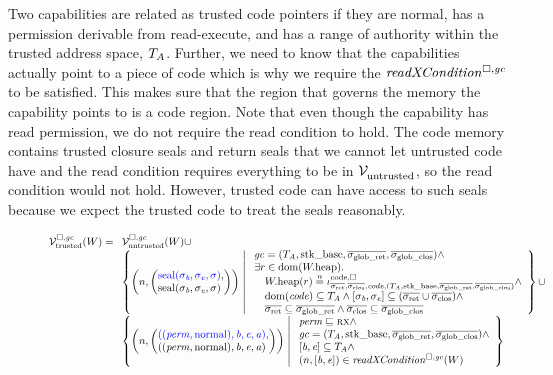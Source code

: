 \begin{jversion}
Two capabilities are related as trusted code pointers if they are normal, has a permission derivable from read-execute, and has a range of authority within the trusted address space, $\ta$.
Further, we need to know that the capabilities actually point to a piece of code which is why we require the $\xReadCond{}$ to be satisfied.
This makes sure that the region that governs the memory the capability points to is a code region.
Note that even though the capability has read permission, we do not require the read condition to hold.
The code memory contains trusted closure seals and return seals that we cannot let untrusted code have and the read condition requires everything to be in $\lrv[]$, so the read condition would not hold.
However, trusted code can have access to such seals because we expect the trusted code to treat the seals reasonably.
\begin{figure}
  \centering
  \[
  \lrvtrusted[\square,\gc](W) =
  \begin{array}[t]{l}
    \lrv(W)\cup \\
%
    \left\{ \npair{\left(\arraycolsep=0pt\array{l} \src{\seal{\sigma_\baddr,\sigma_\eaddr,\sigma}},\\ \seal{\sigma_\baddr,\sigma_\eaddr,\sigma} \endarray \right)} 
    \; \middle| \;
    \begin{array}{l}
      \gc = (\ta,\stkb,\gsigrets,\gsigcloss)  \wedge \\
      \exists r \in \dom(\pwheap) \ldotp \\
      \quad \pwheap(r) \nequal \codereg{\sigrets,\sigcloss,\code,(\ta,\stkb,\gsigrets,\gsigcloss)} \wedge\\
      \quad \dom(\code) \subseteq \ta \wedge [\sigma_\baddr,\sigma_\eaddr] \subseteq (\sigrets\cup\sigcloss) \wedge\\
      \quad \sigrets \subseteq \gsigrets \wedge \sigcloss \subseteq \gsigcloss
    \end{array}
    \right\} \cup \\
    \left\{ \npair{\left(\arraycolsep=0pt\array{l} \src{((\perm,\normal),\baddr,\eaddr,\aaddr)},\\ ((\perm,\normal),\baddr,\eaddr,\aaddr) \endarray \right)} \;\middle|\; 
    \begin{array}{l}
      \perm \sqsubseteq \rx \wedge \\
      \gc = (\ta,\stkb,\gsigrets,\gsigcloss)  \wedge \\
      {} [\baddr,\eaddr] \subseteq \ta \wedge\\
      \npair{[\baddr,\eaddr]} \in \xReadCond[\square,\gc]{W} 
    \end{array}
    \right\}
  \end{array}
\]


\end{figure}
\end{jversion}
